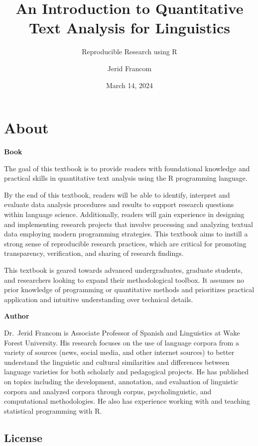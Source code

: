 \documentclass[
  letterpaper,
]{latex/krantz}
\title{An Introduction to Quantitative Text Analysis for Linguistics}
\subtitle{Reproducible Research using R}
\author{Jerid Francom}
\date{March 14, 2024}
\renewcommand*\contentsname{Table of contents}
\newcommand\contentsname{Table of contents}
\theoremstyle{definition}
\theoremstyle{remark}
\begin{document}
\maketitle

\renewcommand*\contentsname{Table of contents}
{
\setcounter{tocdepth}{2}
\tableofcontents
}

\chapter*{About}\label{about}


\textbf{Book}

The goal of this textbook is to provide readers with foundational
knowledge and practical skills in quantitative text analysis using the R
programming language.

By the end of this textbook, readers will be able to identify, interpret
and evaluate data analysis procedures and results to support research
questions within language science. Additionally, readers will gain
experience in designing and implementing research projects that involve
processing and analyzing textual data employing modern programming
strategies. This textbook aims to instill a strong sense of reproducible
research practices, which are critical for promoting transparency,
verification, and sharing of research findings.

This textbook is geared towards advanced undergraduates, graduate
students, and researchers looking to expand their methodological
toolbox. It assumes no prior knowledge of programming or quantitative
methods and prioritizes practical application and intuitive
understanding over technical details.

\textbf{Author}

Dr.~Jerid Francom is Associate Professor of Spanish and Linguistics at
Wake Forest University. His research focuses on the use of language
corpora from a variety of sources (news, social media, and other
internet sources) to better understand the linguistic and cultural
similarities and differences between language varieties for both
scholarly and pedagogical projects. He has published on topics including
the development, annotation, and evaluation of linguistic corpora and
analyzed corpora through corpus, psycholinguistic, and computational
methodologies. He also has experience working with and teaching
statistical programming with R.

\section*{License}\label{license}
\end{document}
